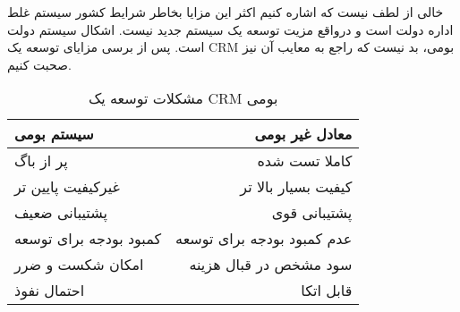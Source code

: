 خالی از لطف نیست که اشاره کنیم اکثر این مزایا بخاطر شرایط کشور  سیستم غلط اداره دولت است و درواقع مزیت توسعه یک سیستم جدید نیست. اشکال سیستم دولت است.
پس از برسی مزایای توسعه یک CRM بومی، بد نیست که راجع به معایب آن نیز صحبت کنیم.

\begin{table}[h!]
	\begin{center}
		\caption{مشکلات توسعه یک CRM بومی}
		\label{tap:old_crm_is_better}
		\begin{tabular}{|l|r|}
			\hline
			سیستم بومی & معادل غیر بومی \\
			\hline
			پر از باگ & کاملا تست شده \\
			\hline
			غیرکیفیت پایین تر & کیفیت بسیار بالا تر \\
			\hline
			پشتیبانی ضعیف & پشتیبانی قوی \\
			\hline
			کمبود بودجه برای توسعه & عدم کمبود بودجه برای توسعه \\
			\hline
			امکان شکست و ضرر & سود مشخص در قبال هزینه \\
			\hline
			احتمال نفوذ & قابل اتکا \\
			\hline
		\end{tabular}
	\end{center}
\end{table}

\clearpage
